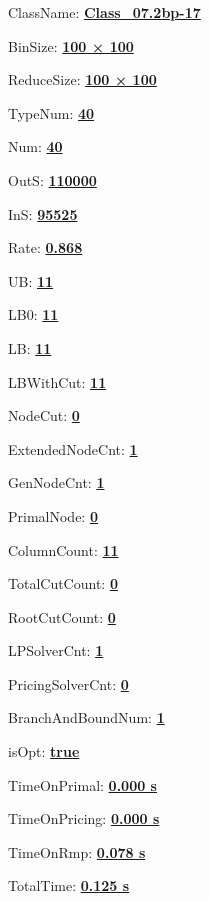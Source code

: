 \documentclass[11pt]{article}
\begin{document}
\pagestyle{empty}


ClassName: \underline{\textbf{Class_07.2bp-17}}
\par
BinSize: \underline{\textbf{100 × 100}}
\par
ReduceSize: \underline{\textbf{100 × 100}}
\par
TypeNum: \underline{\textbf{40}}
\par
Num: \underline{\textbf{40}}
\par
OutS: \underline{\textbf{110000}}
\par
InS: \underline{\textbf{95525}}
\par
Rate: \underline{\textbf{0.868}}
\par
UB: \underline{\textbf{11}}
\par
LB0: \underline{\textbf{11}}
\par
LB: \underline{\textbf{11}}
\par
LBWithCut: \underline{\textbf{11}}
\par
NodeCut: \underline{\textbf{0}}
\par
ExtendedNodeCnt: \underline{\textbf{1}}
\par
GenNodeCnt: \underline{\textbf{1}}
\par
PrimalNode: \underline{\textbf{0}}
\par
ColumnCount: \underline{\textbf{11}}
\par
TotalCutCount: \underline{\textbf{0}}
\par
RootCutCount: \underline{\textbf{0}}
\par
LPSolverCnt: \underline{\textbf{1}}
\par
PricingSolverCnt: \underline{\textbf{0}}
\par
BranchAndBoundNum: \underline{\textbf{1}}
\par
isOpt: \underline{\textbf{true}}
\par
TimeOnPrimal: \underline{\textbf{0.000 s}}
\par
TimeOnPricing: \underline{\textbf{0.000 s}}
\par
TimeOnRmp: \underline{\textbf{0.078 s}}
\par
TotalTime: \underline{\textbf{0.125 s}}
\par
\newpage


\end{document}
